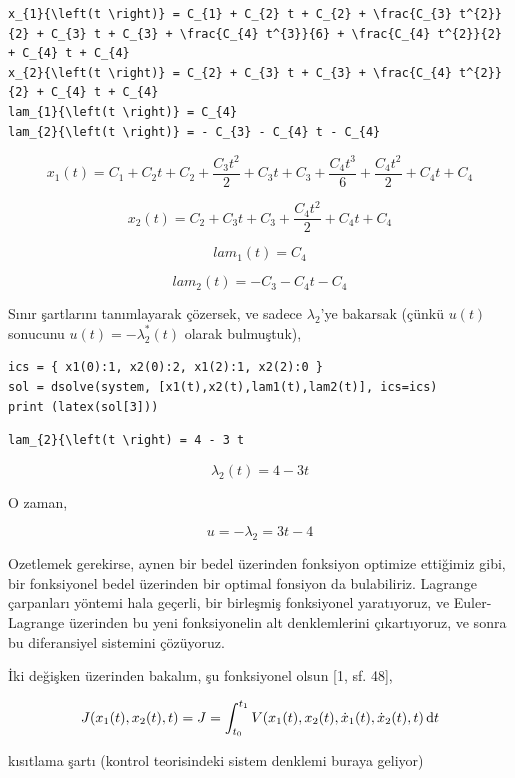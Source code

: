 \documentclass[12pt,fleqn]{article}\usepackage{../../common}
\begin{document}
\begin{verbatim}
x_{1}{\left(t \right)} = C_{1} + C_{2} t + C_{2} + \frac{C_{3} t^{2}}{2} + C_{3} t + C_{3} + \frac{C_{4} t^{3}}{6} + \frac{C_{4} t^{2}}{2} + C_{4} t + C_{4}
x_{2}{\left(t \right)} = C_{2} + C_{3} t + C_{3} + \frac{C_{4} t^{2}}{2} + C_{4} t + C_{4}
lam_{1}{\left(t \right)} = C_{4}
lam_{2}{\left(t \right)} = - C_{3} - C_{4} t - C_{4}
\end{verbatim}

$$
x_{1}{\left(t \right)} = C_{1} + C_{2} t + C_{2} + \frac{C_{3} t^{2}}{2} + C_{3} t + C_{3} + \frac{C_{4} t^{3}}{6} + \frac{C_{4} t^{2}}{2} + C_{4} t + C_{4}
$$

$$
x_{2}{\left(t \right)} = C_{2} + C_{3} t + C_{3} + \frac{C_{4} t^{2}}{2} + C_{4} t + C_{4}
$$

$$
lam_{1}{\left(t \right)} = C_{4}
$$

$$
lam_{2}{\left(t \right)} = - C_{3} - C_{4} t - C_{4}
$$

Sınır şartlarını tanımlayarak çözersek, ve sadece $\lambda_2$'ye
bakarsak (çünkü $u(t)$ sonucunu $u(t) = -\lambda_2^*(t)$ olarak bulmuştuk),

\begin{verbatim}
ics = { x1(0):1, x2(0):2, x1(2):1, x2(2):0 } 
sol = dsolve(system, [x1(t),x2(t),lam1(t),lam2(t)], ics=ics)
print (latex(sol[3]))
\end{verbatim}

\begin{verbatim}
lam_{2}{\left(t \right) = 4 - 3 t
\end{verbatim}

$$
\lambda_{2}{\left(t \right)} = 4 - 3 t
$$

O zaman, 

$$
u = -\lambda_2 = 3t - 4
$$

Ozetlemek gerekirse, aynen bir bedel üzerinden fonksiyon optimize ettiğimiz
gibi, bir fonksiyonel bedel üzerinden bir optimal fonsiyon da
bulabiliriz. Lagrange çarpanları yöntemi hala geçerli, bir birleşmiş
fonksiyonel yaratıyoruz, ve Euler-Lagrange üzerinden bu yeni fonksiyonelin
alt denklemlerini çıkartıyoruz, ve sonra bu diferansiyel sistemini
çözüyoruz.

İki değişken üzerinden bakalım, şu fonksiyonel olsun [1, sf. 48], 

$$
J(x_1(t),x_2(t),t) = J = 
\int _{t_0}^{t_1} V(x_1(t), x_2(t), \dot{x}_1(t), \dot{x}_2(t), t) \,\mathrm{d} t
$$

kısıtlama şartı (kontrol teorisindeki sistem denklemi buraya geliyor)
\end{document}
